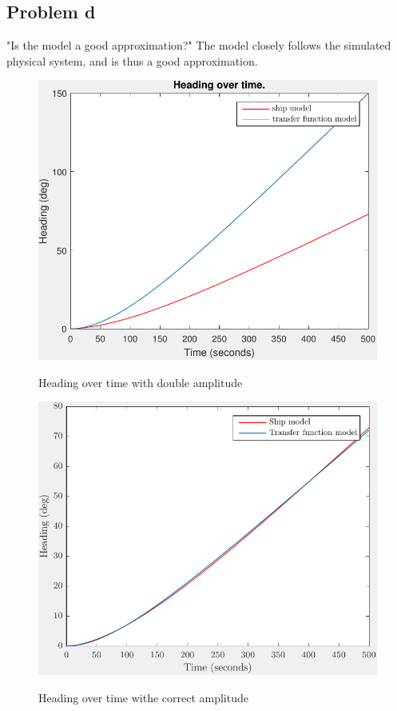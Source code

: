 \subsection{Problem d}
"Is the model a good approximation?"
The model closely follows the simulated physical system, and is thus a good approximation.

\begin{figure}[ht]
    \centering
    \begin{minipage}[b]{0.48\textwidth}
        \includegraphics[width=\textwidth]{"images/1d-dobbel_amplitude"}
        \label{fig:1d-dobbel_amplitude}
        \caption{Heading over time with double amplitude}
    \end{minipage}
    \hfill
    \begin{minipage}[b]{0.48\textwidth}
        \includegraphics[width=\textwidth]{"images/1d-riktig_amplitude"}
        \label{fig:1d-riktig_amplitude}
        \caption{Heading over time withe correct amplitude}
    \end{minipage}
\end{figure}